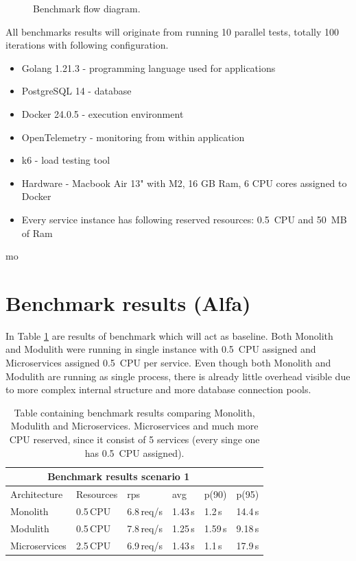 \begin{figure}
    \centering
    
    \caption{Benchmark flow diagram. \label{img:benchmark_flow}}
\end{figure}

All benchmarks results will originate from running 10 parallel tests, totally 100 iterations with following configuration.
\begin{itemize}
    \item Golang 1.21.3 - programming language used for applications
    \item PostgreSQL 14 - database
    \item Docker 24.0.5 - execution environment
    \item OpenTelemetry - monitoring from within application
    \item k6 - load testing tool
    \item Hardware - Macbook Air 13" with M2, 16 GB Ram, 6 CPU cores assigned to Docker
    \item Every service instance has following reserved resources: 0.5~CPU and 50~MB of Ram
\end{itemize}mo

\section{Benchmark results (Alfa)}

In Table \ref{table:benchmark_baseline} are results of benchmark which will act as baseline. Both Monolith and Modulith were running in single instance with 0.5~CPU assigned and Microservices assigned 0.5~CPU per service. Even though both Monolith and Modulith are running as single process, there is already little overhead visible due to more complex internal structure and more database connection pools.

\begin{table}
    \begin{tabular}{ |p{3cm}||p{3cm}|p{1.5cm}|p{1.5cm}|p{1.5cm}|p{1.5cm}| }
        \hline
        \multicolumn{5}{|c|}{Benchmark results scenario 1}                   \\
        \hline
        Architecture  & Resources & rps        & avg     & p(90)   & p(95)   \\
        \hline
        Monolith      & 0.5\,CPU  & 6.8\,req/s & 1.43\,s & 1.2\,s  & 14.4\,s \\
        Modulith      & 0.5\,CPU  & 7.8\,req/s & 1.25\,s & 1.59\,s & 9.18\,s \\
        Microservices & 2.5\,CPU  & 6.9\,req/s & 1.43\,s & 1.1\,s  & 17.9\,s \\
        \hline
    \end{tabular}
    \caption{Table containing benchmark results comparing Monolith, Modulith and Microservices. Microservices and much more CPU reserved, since it consist of 5 services (every singe one has 0.5~CPU assigned).\label{table:benchmark_baseline}}
\end{table}

